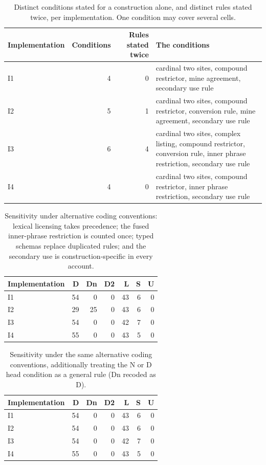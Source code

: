 \begin{table}[H]\centering\small
\caption{Distinct conditions stated for a construction alone, and distinct rules stated twice, per implementation. One condition may cover several cells.}\label{tab:rules}
\begin{tabular}{lrr>{\raggedright\arraybackslash}p{7.6cm}}
\toprule
Implementation & Conditions & Rules stated twice & The conditions \\
\midrule
I1 & 4 & 0 & cardinal two sites, compound restrictor, mine agreement, secondary use rule \\
I2 & 5 & 1 & cardinal two sites, compound restrictor, conversion rule, mine agreement, secondary use rule \\
I3 & 6 & 4 & cardinal two sites, complex listing, compound restrictor, conversion rule, inner phrase restriction, secondary use rule \\
I4 & 4 & 0 & cardinal two sites, compound restrictor, inner phrase restriction, secondary use rule \\
\bottomrule
\end{tabular}
\end{table}

\begin{table}[H]\centering\small
\caption{Sensitivity under alternative coding conventions: lexical licensing takes precedence; the fused inner-phrase restriction is counted once; typed schemas replace duplicated rules; and the secondary use is construction-specific in every account.}
\begin{tabular}{lrrrrrr}
\toprule
Implementation & D & Dn & D2 & L & S & U \\
\midrule
I1 & 54 & 0 & 0 & 43 & 6 & 0 \\
I2 & 29 & 25 & 0 & 43 & 6 & 0 \\
I3 & 54 & 0 & 0 & 42 & 7 & 0 \\
I4 & 55 & 0 & 0 & 43 & 5 & 0 \\
\bottomrule
\end{tabular}
\end{table}

\begin{table}[H]\centering\small
\caption{Sensitivity under the same alternative coding conventions, additionally treating the N or D head condition as a general rule (Dn recoded as D).}
\begin{tabular}{lrrrrrr}
\toprule
Implementation & D & Dn & D2 & L & S & U \\
\midrule
I1 & 54 & 0 & 0 & 43 & 6 & 0 \\
I2 & 54 & 0 & 0 & 43 & 6 & 0 \\
I3 & 54 & 0 & 0 & 42 & 7 & 0 \\
I4 & 55 & 0 & 0 & 43 & 5 & 0 \\
\bottomrule
\end{tabular}
\end{table}

